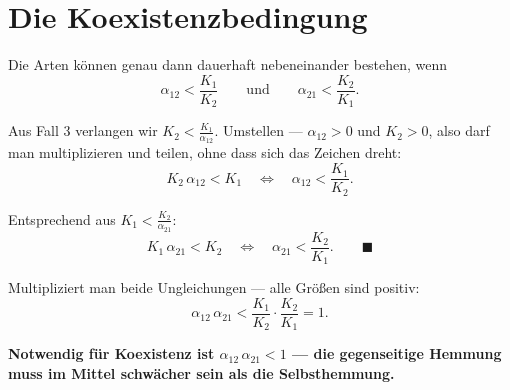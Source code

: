 \begin{merksatz}
\begin{center}
\begin{minipage}{0.88\textwidth}
\end{minipage}
\end{center}
\end{merksatz}

\section{Die Koexistenzbedingung}

\begin{merksatz}
Die Arten können genau dann dauerhaft nebeneinander bestehen, wenn
\[ \alpha_{12} < \frac{K_1}{K_2} \qquad\text{und}\qquad \alpha_{21} < \frac{K_2}{K_1} . \]

Aus Fall 3 verlangen wir $K_2 < \frac{K_1}{\alpha_{12}}$. Umstellen --- $\alpha_{12} > 0$ und $K_2 > 0$, also darf man multiplizieren und teilen, ohne dass sich das Zeichen dreht:
\[ K_2\,\alpha_{12} < K_1 \quad\Longleftrightarrow\quad \alpha_{12} < \frac{K_1}{K_2} . \]

Entsprechend aus $K_1 < \frac{K_2}{\alpha_{21}}$:
\[ K_1\,\alpha_{21} < K_2 \quad\Longleftrightarrow\quad \alpha_{21} < \frac{K_2}{K_1} . \qquad \blacksquare \]

Multipliziert man beide Ungleichungen --- alle Größen sind positiv:
\[ \alpha_{12}\,\alpha_{21} < \frac{K_1}{K_2}\cdot\frac{K_2}{K_1} = 1 . \]

\begin{center}
\begin{minipage}{0.9\textwidth}
\textbf{Notwendig für Koexistenz ist $\alpha_{12}\,\alpha_{21} < 1$ --- die gegenseitige Hemmung muss im Mittel schwächer sein als die Selbsthemmung.}
\end{minipage}
\end{center}
\end{merksatz}

